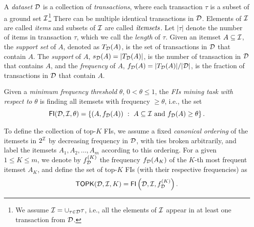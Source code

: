 A \emph{dataset} ${\cal D}$ is a collection of \emph{transactions}, where each
transaction $\tau$ is a subset of a ground set ${\cal I}$\footnote{We assume
${\cal I}=\cup_{\tau\in{\cal D}} \tau$, i.e., all the elements of ${\cal I}$ appear in at
least one transaction from ${\cal D}$.} There can be multiple
identical transactions in ${\cal D}$. Elements of ${\cal I}$ are called \emph{items} and
subsets of ${\cal I}$ are called $\emph{itemsets}$. Let $|\tau|$ denote the number
of items in transaction $\tau$, which we call the \emph{length} of $\tau$. Given
an itemset $A\subseteq{\cal I}$, the \emph{support set} of $A$, denoted as
$T_{\cal D}(A)$, is the set of transactions in ${\cal D}$ that contain $A$. The
\emph{support} of $A$, $s_{\cal D}(A) =|T_{\cal D}(A)|$, is the number of transaction
in ${\cal D}$ that contains $A$, and the \emph{frequency} of $A$, $f_{\cal D}(A)=
|T_{\cal D}(A)|/|{\cal D}|$, is the fraction of transactions in ${\cal D}$ that contain
$A$.
\begin{definition}\label{def:vcmineminethreshold}
  Given a \emph{minimum frequency
  threshold} $\theta$, $0<\theta\le 1$, the \emph{FIs mining task with respect
  to $\theta$} is finding all itemsets with frequency $\geq\theta$, i.e., the
  set 
  \[ \mathsf{FI}({\cal D},{\cal I},\theta)=\left\{(A,f_{\cal D}(A)) ~:~ A \subseteq{\cal I} \mbox{ and }
  f_{{\cal D}}(A)\ge \theta\right\}.  \]
\end{definition}
  To define the collection of top-$K$ FIs, we assume a fixed \textit{canonical
  ordering} of the itemsets in $2^{\cal I}$ by decreasing frequency in ${\cal D}$, with
  ties broken arbitrarily, and label the itemsets $A_1,A_2,\dotsc,A_m$ according
  to this ordering.  For a given $1 \leq K \leq m$, we denote by
  $f^{(K)}_{\cal D}$ the frequency $f_{\cal D}(A_K)$ of the $K$-th most frequent itemset
  $A_K$, and define the set of top-$K$ FIs  (with their respective frequencies)
  as
  \begin{equation}\label{eq:topkfiequiv}
    \mathsf{TOPK}({\cal D},{\cal I},K)= \mathsf{FI}\left({\cal D},{\cal I},f^{(K)}_{\cal D}\right).
  \end{equation}

